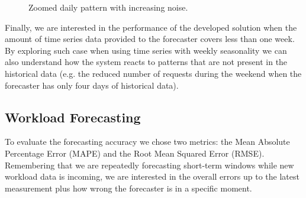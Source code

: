\documentclass[a4paper, 12pt]{article} %
\begin{document}
	\begin{figure}\centering
		 \hfill
		
		\caption{Zoomed daily pattern with increasing noise.}
		\label{fig:daily_noises}
	\end{figure}
	
	Finally, we are interested in the performance of the developed solution when the amount of time series data provided to the forecaster covers less than one week. By exploring such case when using time series with weekly seasonality we can also understand how the system reacts to patterns that are not present in the historical data (e.g. the reduced number of requests during the weekend when the forecaster has only four days of historical data).
	
	\subsection{Workload Forecasting } \label{ssec:exp_workload_forecasting}
	To evaluate the forecasting accuracy we chose two metrics: the Mean Absolute Percentage Error (MAPE) and the Root Mean Squared Error (RMSE).  Remembering that we are repeatedly forecasting short-term windows while new workload data is incoming, we are interested in the overall errors up to the latest measurement plus how wrong the forecaster is in a specific moment.
	
\end{document}
